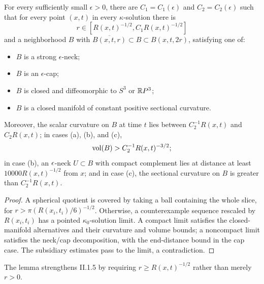 \begin{lemma}
  \label{lem:kl-three-dimensional-solutions-existence-kappa-solutions-5}
 \label{nbhd}
For every sufficiently small $\epsilon>0$, there are
$C_1=C_1(\epsilon)$ and $C_2=C_2(\epsilon)$ such that for every point
$(x,t)$ in every $\kappa$-solution there is
\[
r\in[R(x,t)^{-1/2},C_1R(x,t)^{-1/2}]
\]
and a neighborhood $B$ with
$\overline{B(x,t,r)}\subset B\subset B(x,t,2r)$, satisfying one of:
\begin{itemize}
\item[(a)] $B$ is a strong $\epsilon$-neck;
\item[(b)] $B$ is an $\epsilon$-cap;
\item[(c)] $B$ is closed and diffeomorphic to $S^3$ or ${\mathbb R} P^3$;
\item[(d)] $B$ is a closed manifold of constant positive sectional curvature.
\end{itemize}
Moreover, the scalar curvature on $B$ at time $t$ lies between
$C_2^{-1}R(x,t)$ and $C_2R(x,t)$; in cases (a), (b), and (c),
\[
\operatorname{vol}(B)>C_2^{-1}R(x,t)^{-3/2};
\]
in case (b), an $\epsilon$-neck $U\subset B$ with compact complement lies at
distance at least $10000R(x,t)^{-1/2}$ from $x$; and in case (c), the
sectional curvature on $B$ is greater than $C_2^{-1}R(x,t)$.
\end{lemma}

\begin{proof}
\sketch A spherical quotient is covered by taking a ball containing the whole
slice, for $r>\pi(R(x_i,t_i)/6)^{-1/2}$. Otherwise, a counterexample sequence
rescaled by $R(x_i,t_i)$ has a pointed $\kappa_0$-solution limit. A compact
limit satisfies the closed-manifold alternatives and their curvature and
volume bounds; a noncompact limit satisfies the neck/cap decomposition, with
the end-distance bound in the cap case. The subsidiary estimates pass to the
limit, a contradiction.
\end{proof}

\begin{remark}
  \label{rem:kl-three-dimensional-solutions-structural-remark-three-dimensional-solutions}

The lemma strengthens II.1.5 by requiring
$r\ge R(x,t)^{-1/2}$ rather than merely $r>0$.
\end{remark}

